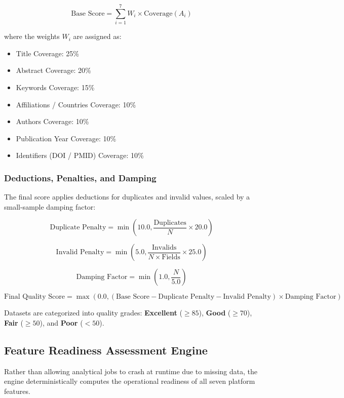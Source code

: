 \begin{equation}
\label{eq:quality_score}
\text{Base Score} = \sum_{i=1}^{7} W_i \times \text{Coverage}(A_i)
\end{equation}

\noindent where the weights $W_i$ are assigned as:
\begin{itemize}
    \item Title Coverage: 25\%
    \item Abstract Coverage: 20\%
    \item Keywords Coverage: 15\%
    \item Affiliations / Countries Coverage: 10\%
    \item Authors Coverage: 10\%
    \item Publication Year Coverage: 10\%
    \item Identifiers (DOI / PMID) Coverage: 10\%
\end{itemize}

\subsubsection{Deductions, Penalties, and Damping}
The final score applies deductions for duplicates and invalid values, scaled by a small-sample damping factor:

\begin{equation}
\text{Duplicate Penalty} = \min\left(10.0, \frac{\text{Duplicates}}{N} \times 20.0\right)
\end{equation}

\begin{equation}
\text{Invalid Penalty} = \min\left(5.0, \frac{\text{Invalids}}{N \times \text{Fields}} \times 25.0\right)
\end{equation}

\begin{equation}
\text{Damping Factor} = \min\left(1.0, \frac{N}{5.0}\right)
\end{equation}

\begin{equation}
\text{Final Quality Score} = \max\left(0.0, (\text{Base Score} - \text{Duplicate Penalty} - \text{Invalid Penalty}) \times \text{Damping Factor}\right)
\end{equation}

Datasets are categorized into quality grades: \textbf{Excellent} ($\ge 85$), \textbf{Good} ($\ge 70$), \textbf{Fair} ($\ge 50$), and \textbf{Poor} ($< 50$).

\subsection{Feature Readiness Assessment Engine}
Rather than allowing analytical jobs to crash at runtime due to missing data, the engine deterministically computes the operational readiness of all seven platform features.

